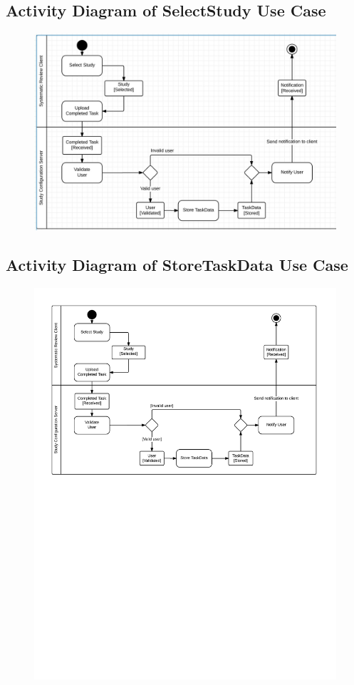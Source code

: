 \subsection{ Activity Diagram of SelectStudy Use Case}
\begin{figure}[H]
  \includegraphics[width=45em]{section/DynamicModel/Activity_Diagram_Select_Study}
  \label{fig: Activity Diagram of StoreTaskData Use Case}
\end{figure}

\subsection{ Activity Diagram of StoreTaskData Use Case}
\begin{figure}[H]
  \includegraphics[width=45em]{section/DynamicModel/Activity_Diagram_StoreTaskData}
  \label{fig: Activity Diagram of StoreTaskData Use Casefail}
\end{figure}

